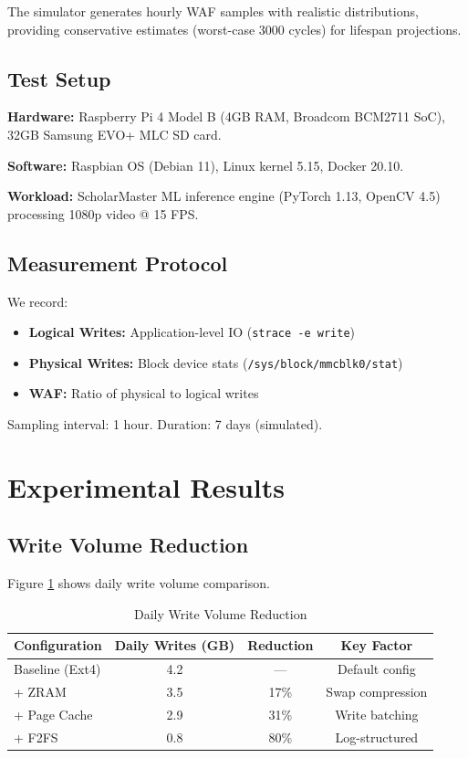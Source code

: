 \documentclass[conference]{IEEEtran}
\begin{document}
The simulator generates hourly WAF samples with realistic distributions, providing conservative estimates (worst-case 3000 cycles) for lifespan projections.

\subsection{Test Setup}

\textbf{Hardware:} Raspberry Pi 4 Model B (4GB RAM, Broadcom BCM2711 SoC), 32GB Samsung EVO+ MLC SD card.

\textbf{Software:} Raspbian OS (Debian 11), Linux kernel 5.15, Docker 20.10.

\textbf{Workload:} ScholarMaster ML inference engine (PyTorch 1.13, OpenCV 4.5) processing 1080p video @ 15 FPS.

\subsection{Measurement Protocol}

We record:
\begin{itemize}
    \item \textbf{Logical Writes:} Application-level IO (\texttt{strace -e write})
    \item \textbf{Physical Writes:} Block device stats (\texttt{/sys/block/mmcblk0/stat})
    \item \textbf{WAF:} Ratio of physical to logical writes
\end{itemize}

Sampling interval: 1 hour. Duration: 7 days (simulated).

\section{Experimental Results}

\subsection{Write Volume Reduction}

Figure \ref{fig:writes} shows daily write volume comparison.

\begin{table}[h]
\caption{Daily Write Volume Reduction}
\begin{center}
\begin{tabular}{lccc}
\toprule
\textbf{Configuration} & \textbf{Daily Writes (GB)} & \textbf{Reduction} & \textbf{Key Factor} \\
\midrule
Baseline (Ext4) & 4.2 & — & Default config \\
+ ZRAM & 3.5 & 17\% & Swap compression \\
+ Page Cache & 2.9 & 31\% & Write batching \\
+ F2FS & 0.8 & 80\% & Log-structured \\
\bottomrule
\end{tabular}
\end{center}
\label{fig:writes}
\end{table}
\end{document}
